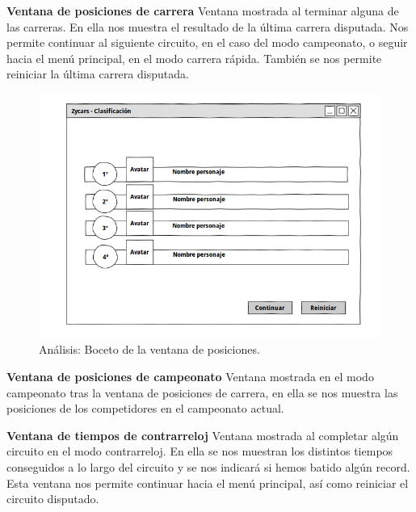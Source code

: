 \begin{description}
    \item \textbf{Ventana de posiciones de carrera} Ventana mostrada al terminar alguna de las carreras. En ella nos muestra el 
    resultado de la última carrera disputada. Nos permite continuar al siguiente circuito, en el caso del modo campeonato, o seguir
    hacia el menú principal, en el modo carrera rápida. También se nos permite
    reiniciar la última carrera disputada.

        \begin{figure}[H]
          \label{diagrama_casos_uso}
          \begin{center}
            \includegraphics[scale=0.42]{imagenes/analisis/boceto_resultados_carrera.png}
          \end{center}
          \caption{Análisis: Boceto de la ventana de posiciones.}
        \end{figure}
        
    \item \textbf{Ventana de posiciones de campeonato} Ventana mostrada en el modo campeonato tras la ventana de posiciones 
    de carrera, en ella se nos muestra las posiciones de los competidores en el campeonato actual.
    
    \item \textbf{Ventana de tiempos de contrarreloj} Ventana mostrada al completar algún circuito en el modo contrarreloj. En ella
    se nos muestran los distintos tiempos conseguidos a lo largo del circuito y se nos indicará si hemos batido algún record.
    Esta ventana nos permite continuar hacia el menú principal, así como reiniciar el circuito disputado.


\end{description}
